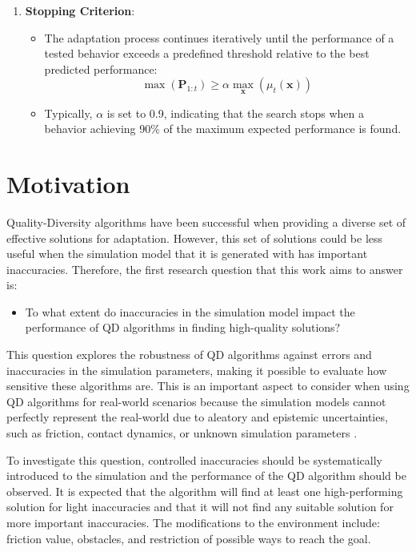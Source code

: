 \documentclass[12pt]{article}
\begin{document}
\begin{enumerate}
    \item \textbf{Stopping Criterion}:
        \begin{itemize}
            \item The adaptation process continues iteratively until the performance of a tested behavior exceeds a predefined threshold relative to the best predicted performance:
            \begin{equation}
            \label{eq:stopping}
            \max(\mathbf{P}_{1:t}) \geq \alpha \max_\mathbf{x} (\mu_t(\mathbf{x}))
            \end{equation}
            \item Typically, \(\alpha\) is set to 0.9, indicating that the search stops when a behavior achieving 90\% of the maximum expected performance is found.
        \end{itemize}
\end{enumerate}

\section{Motivation}
Quality-Diversity algorithms have been successful when providing a diverse set of effective solutions for adaptation. However, this set of solutions could be less useful when the simulation model that it is generated with has important inaccuracies. Therefore, the first research question that this work aims to answer is:
\begin{itemize}
\item To what extent do inaccuracies in the simulation model impact the performance of QD algorithms in finding high-quality solutions?
\end{itemize}
This question explores the robustness of QD algorithms against errors and inaccuracies in the simulation parameters, making it possible to evaluate how sensitive these algorithms are. This is an important aspect to consider when using QD algorithms for real-world scenarios because the simulation models cannot perfectly represent the real-world due to aleatory and epistemic uncertainties, such as friction, contact dynamics, or unknown simulation parameters \citep{choi2021use}. 

To investigate this question, controlled inaccuracies should be systematically introduced to the simulation and the performance of the QD algorithm should be observed. It is expected that the algorithm will find at least one high-performing solution for light inaccuracies and that it will not find any suitable solution for more important inaccuracies. The modifications to the environment include: friction value, obstacles, and restriction of possible ways to reach the goal.
\end{document}
